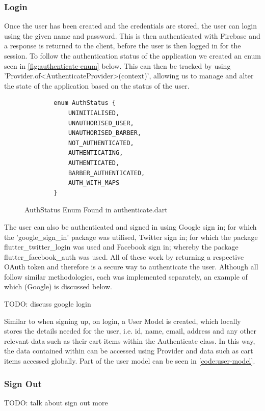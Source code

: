 \documentclass[12pt]{article}
\begin{document}
	
	\subsubsection{Login}
	Once the user has been created and the credentials are stored, the user can login using the given name and password. This is then authenticated with Firebase and a response is returned to the client, before the user is then logged in for the session. To follow the authentication status of the application we created an enum seen in \autoref{fig:authenticate-enum} below. This can then be tracked by using 'Provider.of<AuthenticateProvider>(context)', allowing us to manage and alter the state of the application based on the status of the user.
	
	\begin{figure}[H]
	\centering
	\label{fig:authenticate-enum}
	\begin{verbatim}
		enum AuthStatus {
			UNINITIALISED,
			UNAUTHORISED_USER,
			UNAUTHORISED_BARBER,
			NOT_AUTHENTICATED,
			AUTHENTICATING,
			AUTHENTICATED,
			BARBER_AUTHENTICATED,
			AUTH_WITH_MAPS
		}
	\end{verbatim}
	\caption{AuthStatus Enum Found in authenticate.dart}
	\end{figure}
	
	The user can also be authenticated and signed in using Google sign in; for which the 'google\_sign\_in' package was utilised, Twitter sign in; for which the package flutter\_twitter\_login was used and Facebook sign in; whereby the package flutter\_facebook\_auth was used. All of these work by returning a respective OAuth token and therefore is a secure way to authenticate the user. Although all follow similar methodologies, each was implemented separately, an example of which (Google) is discussed below.
	
	TODO: discuss google login
	
	
	Similar to when signing up, on login, a User Model is created, which locally stores the details needed for the user, i.e. id, name, email, address and any other relevant data such as their cart items within the Authenticate class. In this way, the data contained within can be accessed using Provider and data such as cart items accessed globally. Part of the user model can be seen in \autoref{code:user-model}.
	
	\subsubsection{Sign Out}
	TODO: talk about sign out more
	
\end{document}
